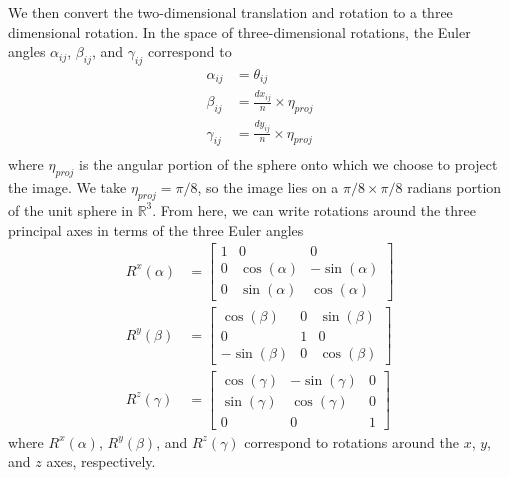 \documentclass{pnastwo}
\begin{document}
\begin{article}
\begin{materials}
%
%
We then convert the two-dimensional translation and rotation to a three dimensional rotation. 
%
In the space of three-dimensional rotations, the Euler angles $\alpha_{ij}$, $\beta_{ij}$, and $\gamma_{ij}$ correspond to
\begin{equation} \label{eq:angle_relations}
\begin{aligned}
	\alpha_{ij} &= \theta_{ij} \\
	\beta_{ij} &= \frac{dx_{ij}}{n} \times \eta_{proj} \\
	\gamma_{ij} &= \frac{dy_{ij}}{n} \times \eta_{proj} \\
\end{aligned}
\end{equation}
where $\eta_{proj}$ is the angular portion of the sphere onto which we choose to project the image.
%
We take $\eta_{proj} =  \pi/8$, so the image lies on a $\pi/8 \times \pi/8$ radians portion of the unit sphere in $\mathbb{R}^3$.
%
From here, we can write rotations around the three principal axes in terms of the three Euler angles
\small
\begin{equation}
\begin{aligned}
	R^x(\alpha) &= \begin{bmatrix}
	1 & 0 & 0 \\
    0 & \cos(\alpha) & -\sin(\alpha) \\
    0 & \sin(\alpha) & \cos(\alpha)
	\end{bmatrix} \\
	R^y(\beta) &= \begin{bmatrix}
	\cos(\beta) & 0 & \sin(\beta) \\
    0 & 1 & 0 \\
    -\sin(\beta) & 0 & \cos(\beta)
    \end{bmatrix} \\
	R^z(\gamma) &= \begin{bmatrix} 
	\cos(\gamma) & -\sin(\gamma) & 0 \\
    \sin(\gamma) & \cos(\gamma) & 0 \\
    0 & 0 & 1 
    \end{bmatrix}
\end{aligned}
\end{equation}
\normalsize
where $R^x(\alpha)$, $R^y(\beta)$, and $R^z(\gamma)$ correspond to rotations around the $x$, $y$, and $z$ axes, respectively.

\end{materials}
\end{article}
\end{document}
